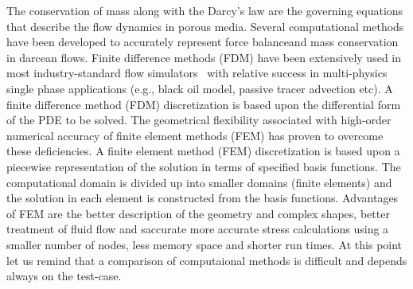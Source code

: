 \documentclass[preprint,authoryear,12pt]{elsarticle}
\begin{document}

\medskip 
The conservation of mass along with the Darcy's law are the governing equations that describe the flow dynamics in porous media. Several computational methods have been developed to accurately represent force balanceand mass conservation in darcean flows.
Finite difference methods (FDM) have been extensively used in most industry-standard flow simulators~\citep{aziz_1986, chen_2005, chang_1990} with relative success in multi-physics single phase applications (e.g., black oil model, passive tracer advection etc). A finite difference method (FDM) discretization is based upon the differential form of the PDE to be solved. 
The geometrical flexibility associated with high-order numerical accuracy of finite element methods (FEM) has proven to overcome these deficiencies. A finite element method (FEM) discretization is based upon a piecewise representation of the solution in terms of specified basis functions. The computational domain is divided up into smaller domains (finite elements) and the solution in each element is constructed from the basis functions. Advantages of FEM are the better description of the geometry and complex shapes, better treatment of fluid flow and saccurate more accurate stress calculations using a smaller number of nodes, less memory space and shorter run times. At this point let us remind that a comparison of computaional methods is difficult and depends always on the test-case.
\end{document}
